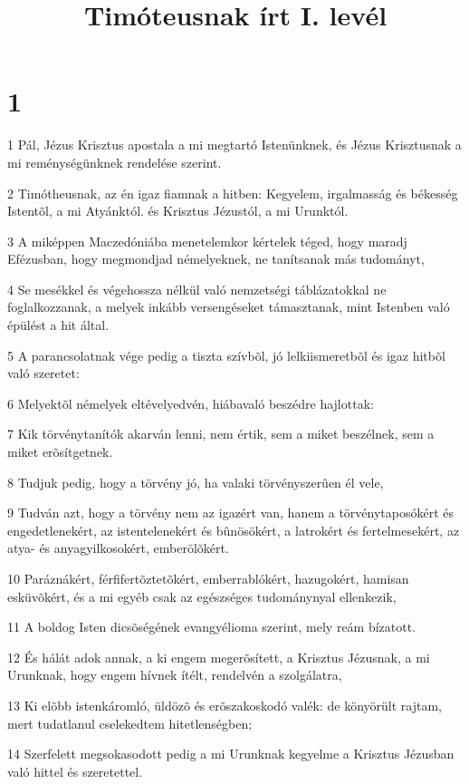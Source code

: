 

\title{Timóteusnak írt I. levél}


\chapter{1}

\par 1 Pál, Jézus Krisztus apostala a mi megtartó Istenünknek, és Jézus Krisztusnak a mi reménységünknek rendelése szerint.
\par 2 Timótheusnak, az én igaz fiamnak a hitben: Kegyelem, irgalmasság és békesség Istentõl, a mi Atyánktól. és Krisztus Jézustól, a mi Urunktól.
\par 3 A miképpen Maczedóniába menetelemkor kértelek téged, hogy maradj Efézusban, hogy megmondjad némelyeknek, ne tanítsanak más tudományt,
\par 4 Se mesékkel és végehossza nélkül való nemzetségi táblázatokkal ne foglalkozzanak, a melyek inkább versengéseket támasztanak,  mint Istenben való épülést a hit által.
\par 5 A parancsolatnak vége pedig a tiszta szívbõl, jó lelkiismeretbõl és igaz hitbõl való szeretet:
\par 6 Melyektõl némelyek eltévelyedvén, hiábavaló beszédre hajlottak:
\par 7 Kik törvénytanítók akarván lenni, nem értik, sem a miket beszélnek, sem a miket erõsítgetnek.
\par 8 Tudjuk pedig, hogy a törvény jó, ha valaki törvényszerûen él vele,
\par 9 Tudván azt, hogy a törvény nem az igazért van, hanem a törvénytaposókért és engedetlenekért, az istentelenekért és bûnösökért, a latrokért és fertelmesekért, az atya- és anyagyilkosokért, emberölõkért.
\par 10 Paráznákért, férfifertõztetõkért, emberrablókért, hazugokért, hamisan esküvõkért, és a mi egyéb csak az egészséges tudománynyal ellenkezik,
\par 11 A boldog Isten dicsõségének evangyélioma szerint, mely reám bízatott.
\par 12 És hálát adok annak, a ki engem megerõsített, a Krisztus Jézusnak, a mi Urunknak, hogy engem hívnek ítélt, rendelvén a szolgálatra,
\par 13 Ki elõbb istenkáromló, üldözõ és erõszakoskodó valék: de könyörült rajtam, mert tudatlanul cselekedtem hitetlenségben;
\par 14 Szerfelett megsokasodott pedig a mi Urunknak kegyelme a Krisztus Jézusban való hittel és szeretettel.
